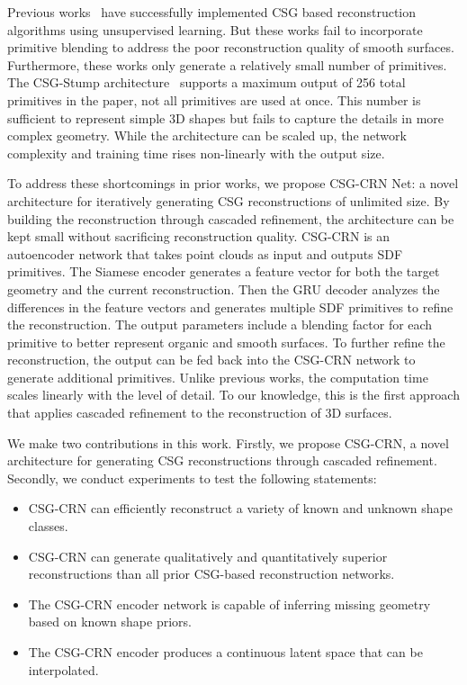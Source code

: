 Previous works~\cite{Sharma2018, Kania2020, Ren2021} have successfully implemented CSG based reconstruction algorithms using unsupervised learning. But these works fail to incorporate primitive blending to address the poor reconstruction quality of smooth surfaces. Furthermore, these works only generate a relatively small number of primitives. The CSG-Stump architecture~\cite{Ren2021} supports a maximum output of 256 total primitives in the paper, not all primitives are used at once. This number is sufficient to represent simple 3D shapes but fails to capture the details in more complex geometry. While the architecture can be scaled up, the network complexity and training time rises non-linearly with the output size.

To address these shortcomings in prior works, we propose CSG-CRN Net: a novel architecture for iteratively generating CSG reconstructions of unlimited size. By building the reconstruction through cascaded refinement, the architecture can be kept small without sacrificing reconstruction quality. CSG-CRN is an autoencoder network that takes point clouds as input and outputs SDF primitives. The Siamese encoder generates a feature vector for both the target geometry and the current reconstruction. Then the GRU decoder analyzes the differences in the feature vectors and generates multiple SDF primitives to refine the reconstruction. The output parameters include a blending factor for each primitive to better represent organic and smooth surfaces. To further refine the reconstruction, the output can be fed back into the CSG-CRN network to generate additional primitives. Unlike previous works, the computation time scales linearly with the level of detail. To our knowledge, this is the first approach that applies cascaded refinement to the reconstruction of 3D surfaces.

We make two contributions in this work. Firstly, we propose CSG-CRN, a novel architecture for generating CSG reconstructions through cascaded refinement. Secondly, we conduct experiments to test the following statements:

\begin{itemize}
	\item CSG-CRN can efficiently reconstruct a variety of known and unknown shape classes.
	\item CSG-CRN can generate qualitatively and quantitatively superior reconstructions than all prior CSG-based reconstruction networks.
	\item The CSG-CRN encoder network is capable of inferring missing geometry based on known shape priors.
	\item The CSG-CRN encoder produces a continuous latent space that can be interpolated.
\end{itemize}